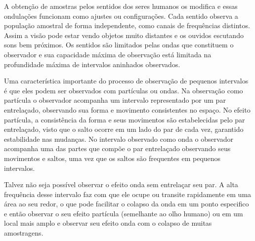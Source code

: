 A obtenção de amostras pelos sentidos dos seres humanos os modifica e essas ondulações funcionam como ajustes ou configurações. Cada sentido observa a população amostral de forma independente, como canais de frequências distintos. Assim a visão pode estar vendo objetos muito distantes e os ouvidos escutando sons bem próximos. Os sentidos são limitados pelas ondas que constituem o observador e sua capacidade máxima de observação está limitada na profundidade máxima de intervalos aninhados observados.

Uma característica importante do processo de observação de pequenos intervalos é que eles podem ser observados com partículas ou ondas. Na observação como partícula o observador acompanha um intervalo representado por um par entrelaçado, observando sua forma e movimento consistentes no espaço. No efeito partícula, a consistência da forma e seus movimentos são estabelecidas pelo par entrelaçado, visto que o salto ocorre em um lado do par de cada vez, garantido estabilidade nas mudanças. No intervalo observado como onda o observador acompanha uma das partes que compõe o par entrelaçado observando seus movimentos e saltos, uma vez que os saltos são frequentes em pequenos intervalos.

Talvez não seja possível observar o efeito onda sem entrelaçar seu par. A alta frequência desse intervalo faz com que ele ocupe ou transite rapidamente em uma área ao seu redor, o que pode facilitar o colapso da onda em um ponto especifico e então observar o seu efeito partícula (semelhante ao olho humano) ou em um local mais amplo e observar seu efeito onda com o colapso de muitas amostragens.
